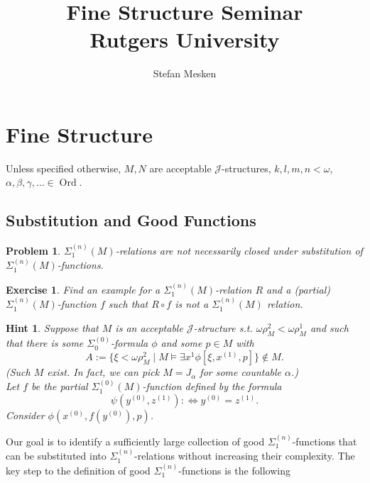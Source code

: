 \documentclass[12pt,a4paper]{article}
\theoremstyle{nicestyle}
\newtheorem{problem}{Problem}[subsection]
\newtheorem{hint}{Hint}[subsection]
\newtheorem{exercise}{Exercise}[subsection]
\DeclareMathOperator{\ord}{Ord}
\begin{document}
\author{Stefan Mesken}
\title{Fine Structure Seminar \\
Rutgers University}
\maketitle

\setcounter{section}{0}
\section{Fine Structure}

Unless specified otherwise, $M,N$ are acceptable
$\mathcal{J}$-structures, $k,l,m,n < \omega$,
$\alpha, \beta, \gamma, \ldots \in \ord$.

\setcounter{subsection}{7}
\subsection{Substitution and Good Functions}


\begin{problem}
  $\Sigma^{(n)}_1(M)$-relations are not necessarily closed under
  substitution of $\Sigma^{(n)}_1(M)$-functions.
\end{problem}

\begin{exercise}
  Find an example for a $\Sigma^{(n)}_1(M)$-relation $R$ and a
  (partial) $\Sigma^{(n)}_1(M)$-function $f$ such that $R \circ f$ is
  not a $\Sigma^{(n)}_1(M)$ relation.
\end{exercise}

\begin{hint}
  Suppose that $M$ is an acceptable $\mathcal{J}$-structure
  s.t. $\omega \rho^2_M < \omega \rho^1_M$ and such that there is some
  $\Sigma^{(0)}_0$-formula $\phi$ and some $p \in M$ with
  \[
    A := \{ \xi < \omega \rho^2_M \mid M \models \exists x^1 \phi [
    \xi, x^{(1)}, p ] \} \not \in M.
  \]
  (Such $M$ exist. In fact, we can pick $M = J_{\alpha}$ for some countable $\alpha$.) \\
  Let $f$ be the partial $\Sigma^{(0)}_1(M)$-function defined by the
  formula
  \[
    \psi(y^{(0)}, z^{(1)}) : \iff y^{(0)} = z^{(1)}.
  \]
 Consider $\phi(x^{(0)}, f(y^{(0)}), p)$.
\end{hint}

Our goal is to identify a sufficiently large collection of good
$\Sigma^{(n)}_1$-functions that can be substituted into
$\Sigma^{(n)}_1$-relations without increasing their complexity. The
key step to the definition of good $\Sigma^{(n)}_{1}$-functions is the
following
\end{document}
